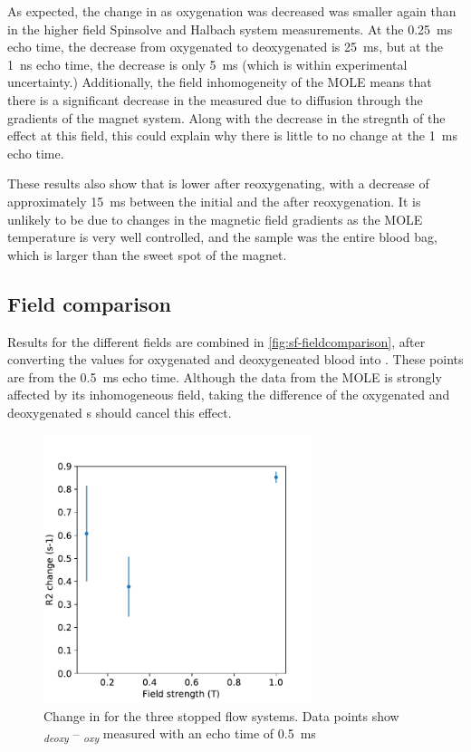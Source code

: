 As expected, the change in \Ttwo as oxygenation was decreased was smaller again than in the higher field Spinsolve and Halbach system measurements.
At the \SI{0.25}{ms} echo time, the decrease from oxygenated to deoxygenated is \SI{25}{ms}, but at the \SI{1}{ns} echo time, the decrease is only \SI{5}{ms} (which is within experimental uncertainty.)
Additionally, the field inhomogeneity of the MOLE means that there is a significant decrease in the measured \Ttwo due to diffusion through the gradients of the magnet system.
Along with the decrease in the stregnth of the effect at this field, this could explain why there is little to no change at the \SI{1}{ms} echo time.

These results also show that \Ttwo is lower after reoxygenating, with a decrease of approximately \SI{15}{ms} between the initial \Ttwo and the \Ttwo after reoxygenation.
It is unlikely to be due to changes in the magnetic field gradients as the MOLE temperature is very well controlled, and the sample was the entire blood bag, which is larger than the sweet spot of the magnet.

\subsection{Field comparison}
Results for the different fields are combined in \autoref{fig:sf-fieldcomparison}, after converting the \Ttwo values for oxygenated and deoxygeneated blood into \Rtwo.
These points are from the \SI{0.5}{ms} echo time.
Although the data from the MOLE is strongly affected by its inhomogeneous field, taking the difference of the oxygenated and deoxygenated \Rtwo{}s should cancel this effect.

\begin{figure}[h]
\centering
\includegraphics[width=0.7\textwidth]{figures/stoppedflow/fieldcomparison.pdf}
\caption[Change in \Rtwo for the three stopped flow systems]{Change in \Rtwo for the three stopped flow systems. Data points show \Rtwo\textsubscript{\textit{deoxy}} -- \Rtwo\textsubscript{\textit{oxy}} measured with an echo time of \SI{0.5}{ms}}
\label{fig:sf-fieldcomparison}
\end{figure}

